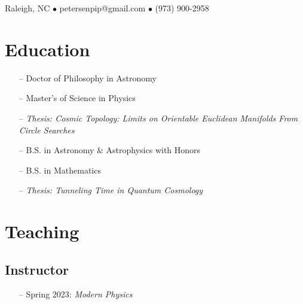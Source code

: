 \documentclass{my_cv}
\begin{document}

\begin{center}
    Raleigh, NC  \hspace{0.2pc} $\bullet$ \hspace{0.2pc} petersenpip@gmail.com \hspace{0.2pc} $\bullet$ \hspace{0.2pc} (973) 900-2958
\end{center}




\section{Education}
\begin{enumerate}
\item[--] {Doctor of Philosophy in Astronomy}
\end{enumerate}

\begin{enumerate}
\item[--] {Master's of Science in Physics}
\item[--] {\textit{Thesis: Cosmic Topology: Limits on Orientable Euclidean Manifolds From Circle Searches}}
\end{enumerate}

\begin{enumerate}
\item[--] {B.S. in Astronomy \& Astrophysics with  Honors}
\item[--] {B.S. in Mathematics}
\item[--] {\textit{Thesis: Tunneling Time in Quantum Cosmology}}
\end{enumerate}



\section{Teaching}
\subsection{Instructor}
\begin{enumerate}
\item[--] {Spring 2023: \textit{Modern Physics}}
\end{enumerate}
\end{document}
